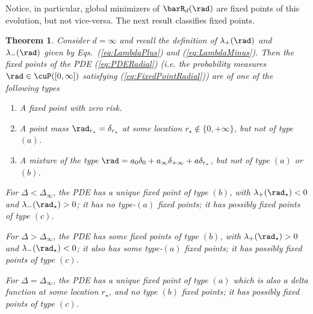 \documentclass[11pt]{article}
\newtheorem{theorem}{Theorem}
\begin{document}
%
%

%
Notice, in particular, global minimizers of $\barR_d(\rad)$ are fixed points of this evolution, but not vice-versa. The next result classifies fixed points.
%

\begin{theorem}\label{thm:local_minimizer_infinite_d_isotropic}
Consider $d = \infty$ and recall the definition of $\lambda_+(\rad)$ and $\lambda_-(\rad)$ given by Eqs.~(\ref{eq:LambdaPlus}) and (\ref{eq:LambdaMinus}). Then the fixed points of the PDE (\ref{eq:PDERadial}) 
(i.e. the probability measures $\rad\in\cuP([0,\infty])$ satisfying (\ref{eq:FixedPointRadial})) are of one of the following types 
\begin{enumerate}
\item[$(a)$] A fixed point with zero risk. 
\item[$(b)$] A point mass $\rad_{r_\star} = \delta_{r_\star}$ at some location $r_\star \not \in\{ 0, +\infty\}$, but not of type $(a)$.
\item[$(c)$] A mixture of the type $\rad = a_0 \delta_0 + a_\infty \delta_{+\infty} + a \delta_{r_\star}$, but not of type $(a)$ or $(b)$.
\end{enumerate}

For  $\Delta < \Delta_\infty$, the PDE has a unique fixed point of type $(b)$, with $\lambda_+(\rad_\star) < 0$ and $\lambda_-(\rad_\star) > 0$; it has no type-$(a)$ fixed points;
it has possibly  fixed points  of type $(c)$.

For $\Delta > \Delta_\infty$, the PDE has some fixed points of type $(b)$, with $\lambda_+(\rad_\star) > 0$ and $\lambda_-(\rad_\star) < 0$; it also has some type-$(a)$ fixed points; 
it has possibly  fixed points  of type $(c)$.

For $\Delta = \Delta_\infty$, the PDE has a unique fixed point of type $(a)$ which is also a delta function at some location $r_\star$, and no type $(b)$ fixed points;
 it has possibly  fixed points  of type $(c)$.
\end{theorem}
%
\end{document}
